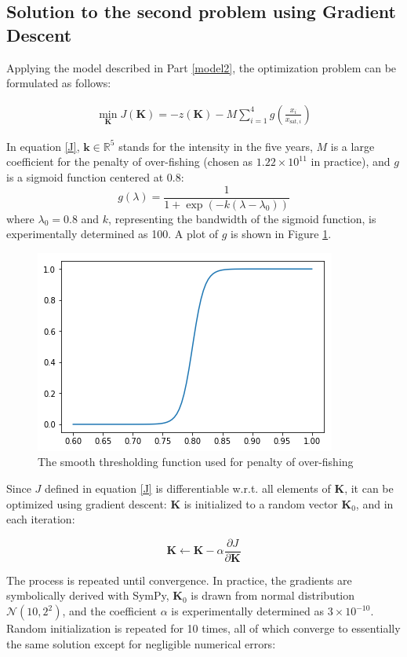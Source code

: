 \documentclass{IEEEtran}
\begin{document}
\subsection{Solution to the second problem using Gradient Descent}

Applying the model described in Part \ref{model2}, the optimization problem can be formulated as follows:

\begin{equation}\begin{aligned}
	\label{J}
	\min\limits_{ \boldsymbol{K}} J(\boldsymbol{K}) = -z( \boldsymbol{K}) - M \sum\limits_{i=1}^4 g(\frac{x_i}{x_{ \mathrm{sat}, i}})
\end{aligned}\end{equation}

In equation \ref{J}, $\boldsymbol{k}\in \mathbb{R}^5$ stands for the intensity in the five years, $M$ is a large coefficient for the penalty of over-fishing (chosen as $1.22\times 10^{11}$ in practice), and $g$ is a sigmoid function centered at 0.8:
$$g(\lambda) = \frac1{1+ \exp(-k(\lambda - \lambda_0))}$$
where $\lambda_0 = 0.8$ and $k$, representing the bandwidth of the sigmoid function, is experimentally determined as 100. A plot of $g$ is shown in Figure \ref{g}.

\begin{figure}[h]
	\centering
	\includegraphics[width=0.6\columnwidth]{g}
	\caption{The smooth thresholding function used for penalty of over-fishing\label{g}}
\end{figure}

Since $J$ defined in equation \ref{J} is differentiable w.r.t. all elements of $\boldsymbol{K}$, it can be optimized using gradient descent: $\boldsymbol{K}$ is initialized to a random vector $\boldsymbol{K}_0$, and in each iteration:

$$\boldsymbol{K}\leftarrow \boldsymbol{K} - \alpha \frac{\partial J}{\partial \boldsymbol{K}}$$

The process is repeated until convergence. In practice, the gradients are symbolically derived with SymPy, $\boldsymbol{K}_0$ is drawn from normal distribution $\mathcal{N}(10, 2^2)$, and the coefficient $\alpha$ is experimentally determined as $3\times 10^{-10}$. Random initialization is repeated for 10 times, all of which converge to essentially the same solution except for negligible numerical errors:
\end{document}
